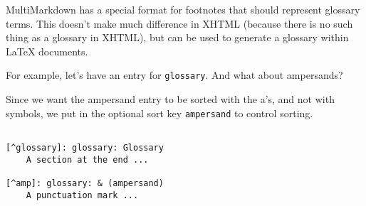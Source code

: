 
\def\mytitle{MultiMarkdown Glossary Test}
\def\latexmode{memoir}

MultiMarkdown has a special format for footnotes that should represent
glossary terms. This doesn't make much difference in XHTML (because there is
no such thing as a glossary in XHTML), but can be used to generate a glossary
within LaTeX documents.

For example, let's have an entry for \texttt{glossary}. And what about
ampersands?\glsadd{& }

Since we want the ampersand entry to be sorted with the a's, and not with
symbols, we put in the optional sort key \texttt{ampersand} to control sorting.

\begin{adjustwidth}{2.5em}{2.5em}
\begin{verbatim}

[^glossary]: glossary: Glossary 
    A section at the end ...

[^amp]: glossary: & (ampersand)
    A punctuation mark ...

\end{verbatim}
\end{adjustwidth}




